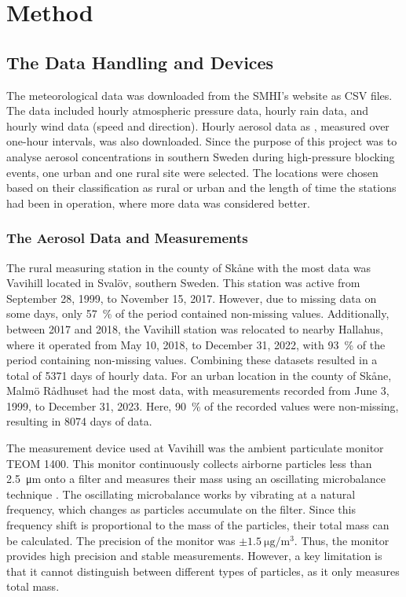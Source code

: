 \newpage
\section{Method} 

\subsection{The Data Handling and Devices}
The meteorological data was downloaded from the SMHI’s website as CSV files. The data included hourly atmospheric pressure data, hourly rain data, and hourly wind data (speed and direction). Hourly aerosol data as \PM, measured over one-hour intervals, was also downloaded. Since the purpose of this project was to analyse aerosol concentrations in southern Sweden during high-pressure blocking events, one urban and one rural site were selected. The locations were chosen based on their classification as rural or urban and the length of time the stations had been in operation, where more data was considered better. 

\subsubsection{The Aerosol Data and Measurements}
The rural measuring station in the county of Skåne with the most data was Vavihill located in Svalöv, southern Sweden. This station was active from September 28, 1999, to November 15, 2017. However, due to missing data on some days, only \SI{57}{\%} of the period contained non-missing values. Additionally, between 2017 and 2018, the Vavihill station was relocated to nearby Hallahus, where it operated from May 10, 2018, to December 31, 2022, with \SI{93}{\%} of the period containing non-missing values. Combining these datasets resulted in a total of \SI{5371}{} days of hourly data. For an urban location in the county of Skåne, Malmö Rådhuset had the most data, with measurements recorded from June 3, 1999, to December 31, 2023. Here, \SI{90}{\%} of the recorded values were non-missing, resulting in \SI{8074}{} days of data. 

The measurement device used at Vavihill was the ambient particulate monitor TEOM 1400. This monitor continuously collects airborne particles less than \SI{2.5}{\micro\meter} onto a filter and measures their mass using an oscillating microbalance technique \cite{thermofisherscientificinc.TEOMSeries1400a2007}. The oscillating microbalance works by vibrating at a natural frequency, which changes as particles accumulate on the filter. Since this frequency shift is proportional to the mass of the particles, their total mass can be calculated. The precision of the monitor was $\pm\SI{1.5}{\micro\gram\per\meter\cubed}$. Thus, the monitor provides high precision and stable measurements. However, a key limitation is that it cannot distinguish between different types of particles, as it only measures total mass.

